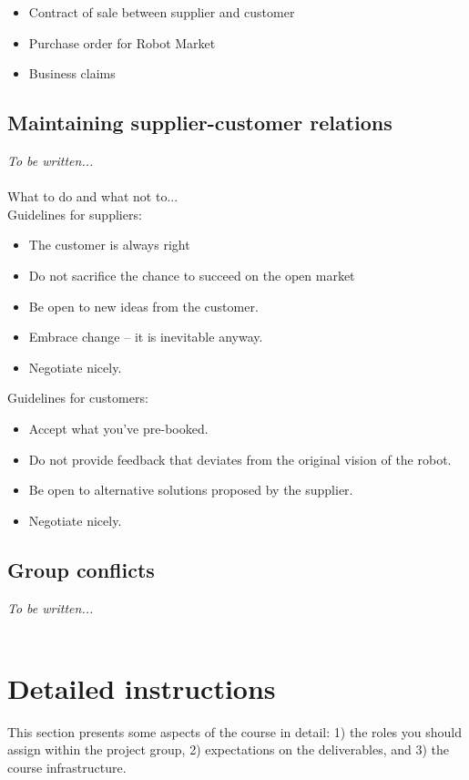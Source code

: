 \documentclass{scrreprt}
\begin{document}
\begin{itemize}
\item Contract of sale between supplier and customer
\item Purchase order for Robot Market
\item Business claims
\end{itemize}

\section{Maintaining supplier-customer relations}
\emph{To be written...}\\\\
What to do and what not to...\\

Guidelines for suppliers:
\begin{itemize}
\item The customer is always right
\item Do not sacrifice the chance to succeed on the open market
\item Be open to new ideas from the customer.
\item Embrace change -- it is inevitable anyway.
\item Negotiate nicely.
\end{itemize}

Guidelines for customers:
\begin{itemize}
\item Accept what you've pre-booked.
\item Do not provide feedback that deviates from the original vision of the robot.
\item Be open to alternative solutions proposed by the supplier.
\item Negotiate nicely.
\end{itemize}

\section{Group conflicts}
\emph{To be written...}\\\\

\chapter{Detailed instructions}
This section presents some aspects of the course in detail: 1) the roles you should assign within the project group, 2) expectations on the deliverables, and 3) the course infrastructure.
\end{document}
